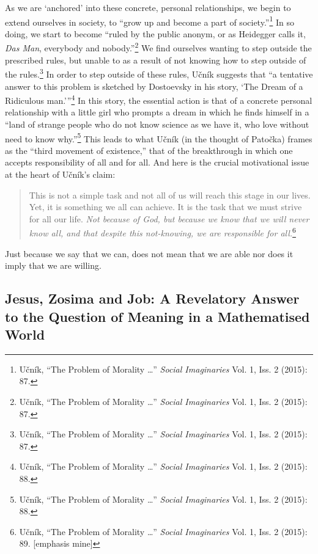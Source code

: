 \documentclass[12pt]{article}
\begin{document}
	As we are `anchored' into these concrete, personal relationships, we begin to extend ourselves in society, to ``grow up and become a part of society.''\footnote{U\v{c}n\'{i}k, ``The Problem of Morality \ldots'' \emph{Social Imaginaries} Vol. 1, Iss. 2 (2015): 87.} In so doing, we start to become ``ruled by the public anonym, or as Heidegger calls it, \emph{Das Man}, everybody and nobody.''\footnote{U\v{c}n\'{i}k, ``The Problem of Morality \ldots'' \emph{Social Imaginaries} Vol. 1, Iss. 2 (2015): 87.} We find ourselves wanting to step outside the prescribed rules, but unable to as a result of not knowing how to step outside of the rules.\footnote{U\v{c}n\'{i}k, ``The Problem of Morality \ldots'' \emph{Social Imaginaries} Vol. 1, Iss. 2 (2015): 87.} In order to step outside of these rules, U\v{c}n\'{i}k suggests that ``a tentative answer to this problem is sketched by Dostoevsky in his story, `The Dream of a Ridiculous man.'\thinspace''\footnote{U\v{c}n\'{i}k, ``The Problem of Morality \ldots'' \emph{Social Imaginaries} Vol. 1, Iss. 2 (2015): 88.} In this story, the essential action is that of a concrete personal relationship with a little girl who prompts a dream in which he finds himself in a ``land of strange people who do not know science as we have it, who love without need to know why.''\footnote{U\v{c}n\'{i}k, ``The Problem of Morality \ldots'' \emph{Social Imaginaries} Vol. 1, Iss. 2 (2015): 88.} This leads to what U\v{c}n\'{i}k (in the thought of Pato\v{c}ka) frames as the ``third movement of existence,'' that of the breakthrough in which one accepts responsibility of all and for all. And here is the crucial motivational issue at the heart of U\v{c}n\'{i}k's claim: 
	
	\begin{quote}
	\singlespacing
	\footnotesize
	
	This is not a simple task and not all of us will reach this stage in our lives. Yet, it is something we all can achieve. It is the task that we must strive for all our life. \emph{Not because of God, but because we know that we will never know all, and that despite this not-knowing, we are responsible for all.}\footnote{U\v{c}n\'{i}k, ``The Problem of Morality \ldots'' \emph{Social Imaginaries} Vol. 1, Iss. 2 (2015): 89. [emphasis mine]}
	
	\end{quote}

	Just because we say that we can, does not mean that we are able nor does it imply that we are willing.
	
	\subsection*{Jesus, Zosima and Job: A Revelatory Answer to the Question of Meaning in a Mathematised World}
	
\end{document}
